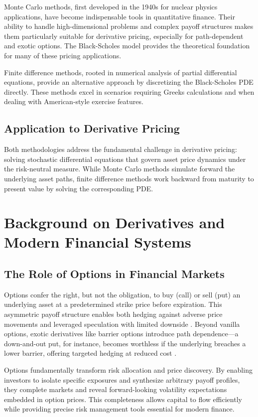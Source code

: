 \documentclass[11pt,a4paper]{article}
\begin{document}
Monte Carlo methods, first developed in the 1940s for nuclear physics applications, have become indispensable tools in quantitative finance. Their ability to handle high-dimensional problems and complex payoff structures makes them particularly suitable for derivative pricing, especially for path-dependent and exotic options. The Black-Scholes model \cite{Black1973} provides the theoretical foundation for many of these pricing applications.

Finite difference methods, rooted in numerical analysis of partial differential equations, provide an alternative approach by discretizing the Black-Scholes PDE \cite{Black1973} directly. These methods excel in scenarios requiring Greeks calculations and when dealing with American-style exercise features.

\subsection{Application to Derivative Pricing}

Both methodologies address the fundamental challenge in derivative pricing: solving stochastic differential equations that govern asset price dynamics under the risk-neutral measure. While Monte Carlo methods simulate forward the underlying asset paths, finite difference methods work backward from maturity to present value by solving the corresponding PDE.

\section{Background on Derivatives and Modern Financial Systems}

\subsection{The Role of Options in Financial Markets}

Options confer the right, but not the obligation, to buy (call) or sell (put) an underlying asset at a predetermined strike price before expiration. This asymmetric payoff structure enables both hedging against adverse price movements and leveraged speculation with limited downside \cite{Hull2018}. Beyond vanilla options, exotic derivatives like barrier options introduce path dependence—a down-and-out put, for instance, becomes worthless if the underlying breaches a lower barrier, offering targeted hedging at reduced cost \cite{Dupont2002}.

Options fundamentally transform risk allocation and price discovery. By enabling investors to isolate specific exposures and synthesize arbitrary payoff profiles, they complete markets and reveal forward-looking volatility expectations embedded in option prices. This completeness allows capital to flow efficiently while providing precise risk management tools essential for modern finance.
\end{document}
